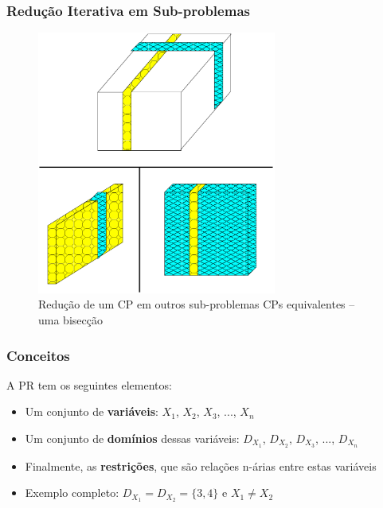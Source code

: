 \documentclass{beamer}
\begin{document}
\begin{frame}[fragile]

\frametitle{Redução Iterativa em Sub-problemas}

\begin{figure}[!htb]

\begin{center}
\includegraphics[width=0.70\textwidth, height=0.60\textheight]{figures/reducao_PR_02.pdf}
\caption{Redução de um CP em outros sub-problemas CPs equivalentes -- uma bisecção}
\end{center}
\end{figure}

    
\end{frame}


\begin{frame}[fragile]
\frametitle{Conceitos}

\begin{block}{A PR tem os seguintes elementos:}
    
    \begin{itemize}
    \item Um conjunto de \textbf{variáveis}: $X_1$, $X_2$, $X_3$, ..., $X_n$ 

    \item Um conjunto de \textbf{domínios} dessas variáveis: $D_{X_1}$, $D_{X_2}$, $D_{X_3}$, ..., $D_{X_n}$

    \item Finalmente, as \textbf{restrições}, que são relações n-árias entre estas variáveis

    \item Exemplo completo: $D_{X_1} = D_{X_2}= \{3,4\}$ e $X_1 \neq X_2$

\end{itemize}

\end{block}
    
\end{frame}
\end{document}
